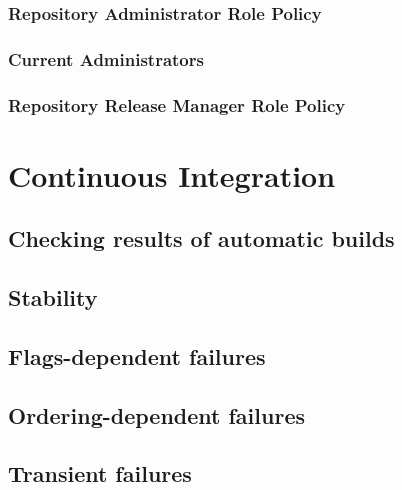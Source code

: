 \documentclass[]{book}
\begin{document}
\hypertarget{repository-administrator-role-policy}{%
\subsection{Repository Administrator Role Policy}\label{repository-administrator-role-policy}}

\hypertarget{current-administrators}{%
\subsection{Current Administrators}\label{current-administrators}}

\hypertarget{repository-release-manager-role-policy}{%
\subsection{Repository Release Manager Role Policy}\label{repository-release-manager-role-policy}}

\hypertarget{continuous-integration}{%
\chapter{Continuous Integration}\label{continuous-integration}}

\hypertarget{checking-results-of-automatic-builds}{%
\section{Checking results of automatic builds}\label{checking-results-of-automatic-builds}}

\hypertarget{stability}{%
\section{Stability}\label{stability}}

\hypertarget{flags-dependent-failures}{%
\section{Flags-dependent failures}\label{flags-dependent-failures}}

\hypertarget{ordering-dependent-failures}{%
\section{Ordering-dependent failures}\label{ordering-dependent-failures}}

\hypertarget{transient-failures}{%
\section{Transient failures}\label{transient-failures}}
\end{document}
